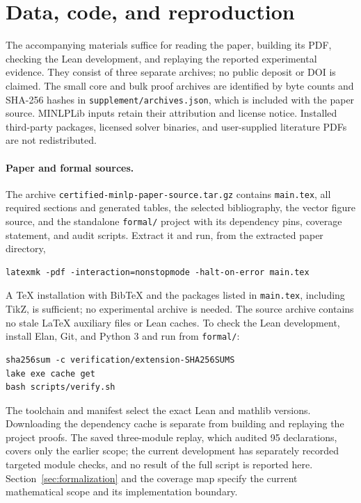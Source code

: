 \section{Data, code, and reproduction}
\label{app:reproduction}
The accompanying materials suffice for reading the paper, building its PDF, checking the Lean development, and replaying the reported experimental evidence. They consist of three separate archives; no public deposit or DOI is claimed. The small core and bulk proof archives are identified by byte counts and SHA-256 hashes in \texttt{supplement/archives.json}, which is included with the paper source. MINLPLib inputs retain their attribution and license notice. Installed third-party packages, licensed solver binaries, and user-supplied literature PDFs are not redistributed.

\paragraph{Paper and formal sources.}
The archive \texttt{certified-minlp-paper-source.tar.gz} contains \texttt{main.tex}, all required sections and generated tables, the selected bibliography, the vector figure source, and the standalone \texttt{formal/} project with its dependency pins, coverage statement, and audit scripts. Extract it and run, from the extracted paper directory,
\begin{verbatim}
latexmk -pdf -interaction=nonstopmode -halt-on-error main.tex
\end{verbatim}
A TeX installation with BibTeX and the packages listed in \texttt{main.tex}, including TikZ, is sufficient; no experimental archive is needed. The source archive contains no stale LaTeX auxiliary files or Lean caches. To check the Lean development, install Elan, Git, and Python 3 and run from \texttt{formal/}:
\begin{verbatim}
sha256sum -c verification/extension-SHA256SUMS
lake exe cache get
bash scripts/verify.sh
\end{verbatim}
The toolchain and manifest select the exact Lean and mathlib versions. Downloading the dependency cache is separate from building and replaying the project proofs. The saved three-module replay, which audited 95 declarations, covers only the earlier scope; the current development has separately recorded targeted module checks, and no result of the full script is reported here. Section~\ref{sec:formalization} and the coverage map specify the current mathematical scope and its implementation boundary.

